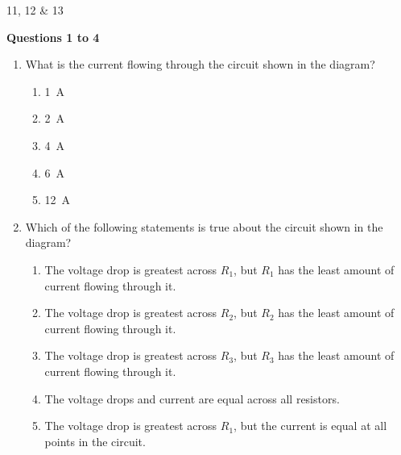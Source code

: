 \documentclass{../../oss-apphys}
\begin{document}
\genheader

         {11, 12 \& 13}

\genmultidirections

\gengravity

\raggedcolumns
\begin{multicols}{2}

  \textbf{Questions 1 to 4}  
  \begin{center}
  \end{center}
  
  \begin{enumerate}[leftmargin=18pt]

  \item What is the current flowing through the circuit shown in the diagram?
    \begin{enumerate}[noitemsep,topsep=0pt,leftmargin=18pt,label=(\Alph*)]
    \item\SI{1}{A}
    \item\SI{2}{A}
    \item\SI{4}{A}
    \item\SI{6}{A}
    \item\SI{12}{A}
    \end{enumerate}
    
  \item Which of the following statements is true about the circuit shown in the
    diagram?
    \begin{enumerate}[noitemsep,topsep=0pt,leftmargin=18pt,label=(\Alph*)]  
    \item The voltage drop is greatest across $R_1$, but $R_1$ has the least
      amount of current flowing through it.
    \item The voltage drop is greatest across $R_2$, but $R_2$ has the least
      amount of current flowing through it.
    \item The voltage drop is greatest across $R_3$, but $R_3$ has the least
      amount of current flowing through it.
    \item The voltage drops and current are equal across all resistors.
    \item The voltage drop is greatest across $R_1$, but the current is equal at
      all points in the circuit.
    \end{enumerate}


\end{enumerate}
\end{multicols}
\end{document}

